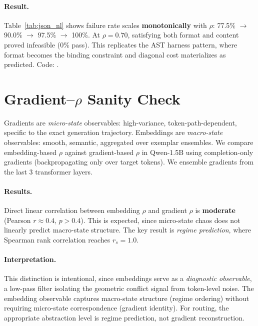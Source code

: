 \documentclass{article}
\theoremstyle{plain}
\theoremstyle{definition}
\theoremstyle{remark}
\begin{document}
\paragraph{Result.}
Table~\ref{tab:json_nl} shows failure rate scales \textbf{monotonically} with $\rho$: 77.5\% $\to$ 90.0\% $\to$ 97.5\% $\to$ 100\%. At $\rho=0.70$, satisfying both format and content proved infeasible (0\% pass). This replicates the AST harness pattern, where format becomes the binding constraint and diagonal cost materializes as predicted. Code: .

\section{Gradient--$\rho$ Sanity Check}\label{app:grad_r}
Gradients are \emph{micro-state} observables: high-variance, token-path-dependent, specific to the exact generation trajectory. Embeddings are \emph{macro-state} observables: smooth, semantic, aggregated over exemplar ensembles. We compare embedding-based $\rho$ against gradient-based $\rho$ in Qwen-1.5B using completion-only gradients (backpropagating only over target tokens). We ensemble gradients from the last 3 transformer layers.

\paragraph{Results.}
Direct linear correlation between embedding $\rho$ and gradient $\rho$ is \textbf{moderate} (Pearson $r \approx 0.4$, $p > 0.4$). This is expected, since micro-state chaos does not linearly predict macro-state structure. The key result is \emph{regime prediction}, where Spearman rank correlation reaches $r_s = 1.0$.

\paragraph{Interpretation.}
This distinction is intentional, since embeddings serve as a \emph{diagnostic observable}, a low-pass filter isolating the geometric conflict signal from token-level noise. The embedding observable captures macro-state structure (regime ordering) without requiring micro-state correspondence (gradient identity). For routing, the appropriate abstraction level is regime prediction, not gradient reconstruction.
\end{document}
